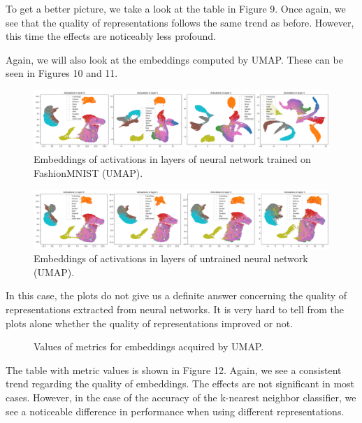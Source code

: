 \documentclass{article}
\begin{document}
To get a better picture, we take a look at the table in Figure 9. Once again,
we see that the quality of representations follows the same trend as before.
However, this time the effects are noticeably less profound.

Again, we will also look at the embeddings computed by UMAP. These can be seen
in Figures 10 and 11.

\begin{figure}
  \centering
    \includegraphics[width=1.0\textwidth]{../../out/activations_feedforward/fmnist_umap_trained.png}
  \caption{Embeddings of activations in layers of neural network trained on FashionMNIST (UMAP).}
\end{figure}

\begin{figure}
  \centering
    \includegraphics[width=1.0\textwidth]{../../out/activations_feedforward/fmnist_umap_untrained.png}
  \caption{Embeddings of activations in layers of untrained neural network (UMAP).}
\end{figure}

In this case, the plots do not give us a definite answer concerning the
quality of representations extracted from neural networks. It is very hard
to tell from the plots alone whether the quality of representations improved
or not.

\begin{figure}
  \centering
    \resizebox{\textwidth}{!}{
        
    }
  \caption{Values of metrics for embeddings acquired by UMAP.}
\end{figure}

The table with metric values is shown in Figure 12. Again, we see
a consistent trend regarding the quality of embeddings. The effects are not
significant in most cases. However, in the case of the accuracy of the k-nearest
neighbor classifier, we see a noticeable difference in performance when
using different representations.
\end{document}
